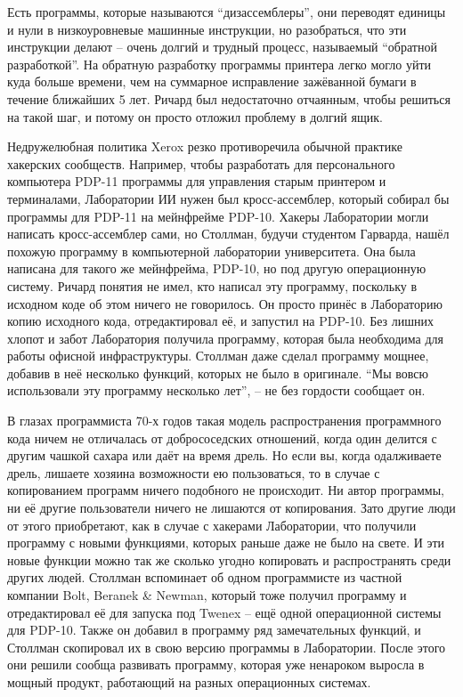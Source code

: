 Есть программы, которые называются \enquote{дизассемблеры}, они переводят единицы и нули в низкоуровневые машинные инструкции, но разобраться, что эти инструкции делают -- очень долгий и трудный процесс, называемый \enquote{обратной разработкой}. На обратную разработку программы принтера легко могло уйти куда больше времени, чем на суммарное исправление зажёванной бумаги в течение ближайших 5 лет. Ричард был недостаточно отчаянным, чтобы решиться на такой шаг, и потому он просто отложил проблему в долгий ящик.

Недружелюбная политика Xerox резко противоречила обычной практике хакерских сообществ. Например, чтобы разработать для персонального компьютера PDP-11 программы для управления старым принтером и терминалами, Лаборатории ИИ нужен был кросс-ассемблер, который собирал бы программы для PDP-11 на мейнфрейме PDP-10. Хакеры Лаборатории могли написать кросс-ассемблер сами, но Столлман, будучи студентом Гарварда, нашёл похожую программу в компьютерной лаборатории университета. Она была написана для такого же мейнфрейма, PDP-10, но под другую операционную систему. Ричард понятия не имел, кто написал эту программу, поскольку в исходном коде об этом ничего не говорилось. Он просто принёс в Лабораторию копию исходного кода, отредактировал её, и запустил на PDP-10. Без лишних хлопот и забот Лаборатория получила программу, которая была необходима для работы офисной инфраструктуры. Столлман даже сделал программу мощнее, добавив в неё несколько функций, которых не было в оригинале. \enquote{Мы вовсю использовали эту программу несколько лет}, -- не без гордости сообщает он.

В глазах программиста 70-х годов такая модель распространения программного кода ничем не отличалась от добрососедских отношений, когда один делится с другим чашкой сахара или даёт на время дрель. Но если вы, когда одалживаете дрель, лишаете хозяина возможности ею пользоваться, то в случае с копированием программ ничего подобного не происходит. Ни автор программы, ни её другие пользователи ничего не лишаются от копирования. Зато другие люди от этого приобретают, как в случае с хакерами Лаборатории, что получили программу с новыми функциями, которых раньше даже не было на свете. И эти новые функции можно так же сколько угодно копировать и распространять среди других людей. Столлман вспоминает об одном программисте из частной компании Bolt, Beranek \& Newman, который тоже получил программу и отредактировал её для запуска под Twenex -- ещё одной операционной системы для PDP-10. Также он добавил в программу ряд замечательных функций, и Столлман скопировал их в свою версию программы в Лаборатории. После этого они решили сообща развивать программу, которая уже ненароком выросла в мощный продукт, работающий на разных операционных системах.

